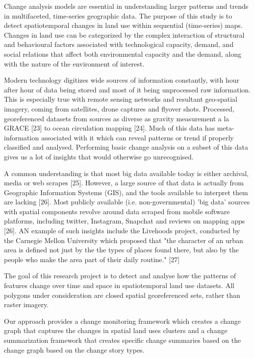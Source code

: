 \documentclass[conference]{IEEEtran}
\begin{document}
Change analysis models are essential in understanding larger patterns and trends in multifaceted, time-series geographic data. The purpose of this study is to detect spatiotemporal changes in land use within sequential (time-series) maps. Changes in land use can be categorized by the complex interaction of structural and behavioural factors associated with technological capacity, demand, and social relations that affect both environmental capacity and the demand, along with the nature of the environment of interest.

Modern technology digitizes wide sources of information constantly, with hour after hour of data being stored and most of it being unprocessed raw information. This is especially true with remote sensing networks and resultant geo-spatial imagery, coming from satellites, drone captures and flyover shots. Processed, georeferenced datasets from sources as diverse as gravity measurement a la GRACE [23] to ocean circulation mapping [24]. Much of this data has meta-information associated with it which can reveal patterns or trend if properly classified and analysed. Performing basic change analysis on a subset of this data gives us a lot of insights that would otherwise go unrecognised.

A common understanding is that most big data available today is either archival, media or web scrapes [25]. However, a large source of that data is actually from Geographic Information Systems (GIS), and the tools available to interpret them are lacking [26]. Most publicly available (i.e. non-governmental) 'big data' sources with spatial components revolve around data scraped from mobile software platforms, including twitter, Instagram, Snapchat and reviews on mapping apps [26]. AN example of such insights include the Livehoods project, conducted by the Carnegie Mellon University which proposed that "the character of an urban area is defined not just by the the types of places found there, but also by the people who make the area part of their daily routine." [27]
 
The goal of this research project is to detect and analyse how the patterns of features change over time and space in spatiotemporal land use datasets. All polygons under consideration are closed spatial  georeferenced sets, rather than raster imagery.

Our approach provides a change monitoring framework which creates a change graph that captures the changes in spatial land uses clusters and a change summarization framework that creates specific change summaries based on the change graph based on the change story types. 
\end{document}
